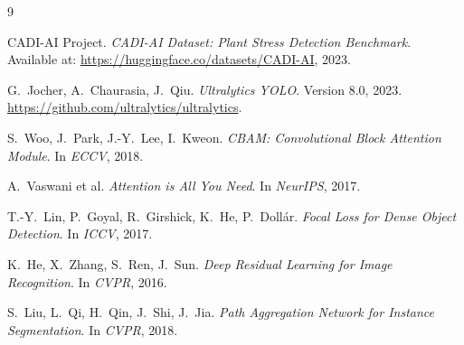 \documentclass[12pt, a4paper]{article}
\begin{document}
\begin{thebibliography}{9}

CADI-AI Project.
\textit{CADI-AI Dataset: Plant Stress Detection Benchmark}.
Available at: \url{https://huggingface.co/datasets/CADI-AI}, 2023.

G.\ Jocher, A.\ Chaurasia, J.\ Qiu.
\textit{Ultralytics YOLO}.
Version 8.0, 2023.
\url{https://github.com/ultralytics/ultralytics}.

S.\ Woo, J.\ Park, J.-Y.\ Lee, I.\ Kweon.
\textit{CBAM: Convolutional Block Attention Module}.
In \textit{ECCV}, 2018.

A.\ Vaswani et al.
\textit{Attention is All You Need}.
In \textit{NeurIPS}, 2017.

T.-Y.\ Lin, P.\ Goyal, R.\ Girshick, K.\ He, P.\ Doll\'{a}r.
\textit{Focal Loss for Dense Object Detection}.
In \textit{ICCV}, 2017.

K.\ He, X.\ Zhang, S.\ Ren, J.\ Sun.
\textit{Deep Residual Learning for Image Recognition}.
In \textit{CVPR}, 2016.

S.\ Liu, L.\ Qi, H.\ Qin, J.\ Shi, J.\ Jia.
\textit{Path Aggregation Network for Instance Segmentation}.
In \textit{CVPR}, 2018.

\end{thebibliography}
\end{document}
